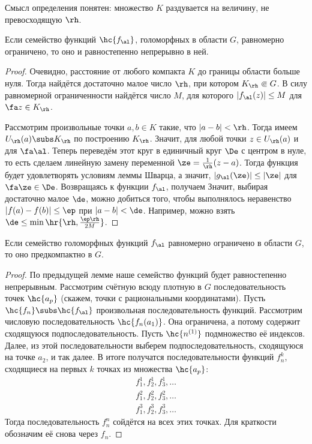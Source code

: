 \documentclass[a4paper]{article}
\begin{document}
\begin{theorem}
Смысл определения понятен: множество $K$ раздувается на величину, не превосходящую $\rh$.

\begin{lemma}
Если семейство функций $\hc{f_\al}$, голоморфных в области $G$, равномерно ограничено, то оно и равностепенно
непрерывно в ней.
\end{lemma}
\begin{proof}
Очевидно, расстояние от любого компакта $K$ до границы области больше нуля. Тогда найдётся достаточно малое число $\rh$,
при котором $K_\rh \Subset G$. В силу равномерной ограниченности найдётся число $M$, для которого $|f_\al(z)|\le M$ для $\fa z \in K_\rh$.

Рассмотрим произвольные точки $a,b\in K$ такие, что $|a-b|<\rh$. Тогда имеем $U_\rh(a) \subs K_\rh$ по построению $K_\rh$.
Значит,
для любой точки $z \in U_\rh(a)$ и для $\fa \al$. Теперь переведём этот круг в единичный круг $\De$ с центром
в нуле, то есть сделаем линейную замену переменной $\ze = \frac{1}{\rh}(z-a)$. Тогда функция
будет удовлетворять условиям леммы Шварца, а значит, $|g_\al(\ze)| \le |\ze|$ для $\fa \ze \in \De$. Возвращаясь
к функции $f_\al$, получаем
Значит, выбирая достаточно малое $\de$, можно добиться того, чтобы выполнялось неравенство $|f(a)-f(b)|\le \ep$ при $|a-b|<\de$.
Например, можно взять $\de \le \min \hr{\rh, \frac{\ep\rh}{2M}}$.
\end{proof}

\begin{theorem}
Если семейство голоморфных функций $f_\al$ равномерно ограничено в области $G$, то оно предкомпактно в $G$.
\end{theorem}
\begin{proof}
По предыдущей лемме наше семейство функций будет равностепенно непрерывным.  Рассмотрим счётную всюду плотную
в $G$ последовательность точек $\hc{a_p}$ (скажем, точки с рациональными координатами).
Пусть $\hc{f_n}\subs \hc{f_\al}$ произвольная последовательность функций. Рассмотрим числовую
последовательность $\hc{f_n(a_1)}$. Она ограничена, а потому содержит сходящуюся подпоследовательность.
Пусть $\hc{n^{(1)}}$ подмножество её индексов. Далее, из этой последовательности выберем подпоследовательность,
сходящуюся на точке $a_2$, и так далее. В итоге получатся последовательности функций $f_n^{k}$, сходящиеся на первых $k$
точках из множества $\hc{a_p}$:
\begin{align*}
f_1^1, f_2^1, f_3^1, \ldots\\
f_1^2, f_2^2, f_3^2, \ldots\\
f_1^3, f_2^3, f_3^3, \ldots
\end{align*}
Тогда последовательность $f_n^n$ сойдётся на всех этих точках. Для краткости обозначим её снова через $f_n$.


\end{proof}
\end{theorem}
\end{document}
